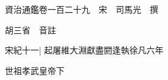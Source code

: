 






























































資治通鑑卷一百二十九　宋　司馬光　撰

胡三省　音註

宋紀十一|{
	起屠維大淵獻盡閼逢執徐凡六年}


世祖孝武皇帝下

